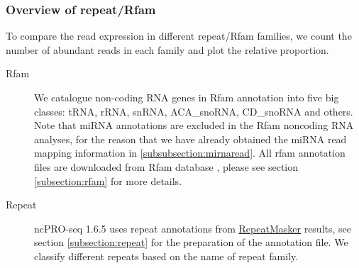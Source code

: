 \documentclass[12pt]{article}
\def \ncpip{ncPRO-seq 1.6.5}
\begin{document}
\subsubsection{Overview of repeat/Rfam}
\label{subsubsection:overview}
To compare the read expression in different repeat/Rfam families, we count the number of abundant reads in each family and plot the relative proportion.
\begin{description}
 \item[Rfam] We catalogue non-coding RNA genes in Rfam annotation into five big classes: tRNA, rRNA, snRNA, ACA\_snoRNA, CD\_snoRNA and others. Note that miRNA annotations are excluded in the Rfam noncoding RNA analyses, for the reason that we have already obtained the miRNA read mapping information in \ref{subsubsection:mirnaread}. All rfam annotation files are downloaded from Rfam database \cite{Gardner2011}, please see section \ref{subsection:rfam} for more details.
 \item[Repeat] \ncpip{} uses repeat annotations from \href{http://www.repeatmasker.org/}{ RepeatMasker} \cite{Smit2008} results, see section \ref{subsection:repeat} for the preparation of the annotation file. We classify different repeats based on the name of repeat family.
 \end{description}
\end{document}
